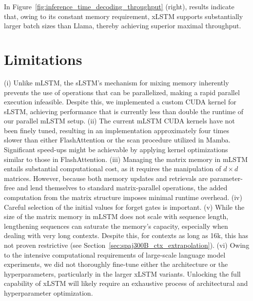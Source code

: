 In Figure~\ref{fig:inference_time_decoding_throughput} (right), results indicate that, owing to its constant memory requirement, xLSTM supports substantially larger batch sizes than Llama, thereby achieving superior maximal throughput.

\section{Limitations}

(i) Unlike mLSTM, the sLSTM’s mechanism for mixing memory inherently prevents the use of operations that can be parallelized, making a rapid parallel execution infeasible. Despite this, we implemented a custom CUDA kernel for sLSTM, achieving performance that is currently less than double the runtime of our parallel mLSTM setup. (ii) The current mLSTM CUDA kernels have not been finely tuned, resulting in an implementation approximately four times slower than either FlashAttention or the scan procedure utilized in Mamba. Significant speed-ups might be achievable by applying kernel optimizations similar to those in FlashAttention. (iii) Managing the matrix memory in mLSTM entails substantial computational cost, as it requires the manipulation of $d \times d$ matrices. However, because both memory updates and retrievals are parameter-free and lend themselves to standard matrix-parallel operations, the added computation from the matrix structure imposes minimal runtime overhead. (iv) Careful selection of the initial values for forget gates is important. (v) While the size of the matrix memory in mLSTM does not scale with sequence length, lengthening sequences can saturate the memory’s capacity, especially when dealing with very long contexts. Despite this, for contexts as long as 16k, this has not proven restrictive (see Section~\ref{sec:spaj300B_ctx_extrapolation}). (vi) Owing to the intensive computational requirements of large-scale language model experiments, we did not thoroughly fine-tune either the architecture or the hyperparameters, particularly in the larger xLSTM variants. Unlocking the full capability of xLSTM will likely require an exhaustive process of architectural and hyperparameter optimization.

